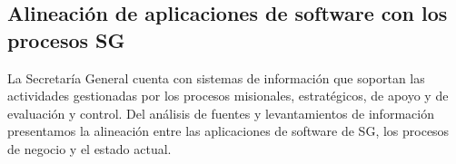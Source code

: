 \documentclass[
	a4paper, %
	12pt, %
]{include/CSSullivanBusinessReport}
\begin{document}
\subsection{Alineación de aplicaciones de software con los procesos
SG}\label{sec:alineaciuxf3n-de-aplicaciones-de-software-con-los-procesos-sg}

\begin{quote}
\end{quote}

La Secretaría General cuenta con sistemas de información que soportan
las actividades gestionadas por los procesos misionales, estratégicos,
de apoyo y de evaluación y control. Del análisis de fuentes y
levantamientos de información presentamos la alineación entre las
aplicaciones de software de SG, los procesos de negocio y el estado
actual.
\end{document}
